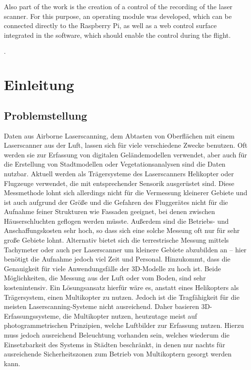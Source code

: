 \documentclass[a4paper,12pt,bibliography=totoc, listof=totoc,titlepage,pointlessnumbers]{scrreprt}
\begin{document}
Also part of the work is the creation of a control of the recording of the laser scanner. For this purpose, an operating module was developed, which can be connected directly to the Raspberry Pi, as well as a web control surface integrated in the software, which should enable the control during the flight.


\providecommand{\citeTwo}[4]{\citep[{\citealp[#1]{#2};}][#3]{#4}} 
\providecommand{\citeThree}[6]{\citep[{\citealp[#1]{#2}; \citealp[#3]{#4};}][#5]{#6}} 
\providecommand{\citeFour}[8]{\citep[{\citealp[#1]{#2}; \citealp[#3]{#4}; \citealp[#5]{#6};}][#7]{#8}}.

\newpage

\tableofcontents
\newpage

\setcounter{page}{1} 

\chapter{Einleitung}

\section{Problemstellung}
Daten aus Airborne Laserscanning, dem Abtasten von Oberflächen mit einem Laser\-scan\-ner aus der Luft, lassen sich für viele verschiedene Zwecke benutzen. Oft werden sie zur Erfassung von digitalen Geländemodellen verwendet, aber auch für die Erstellung von Stadtmodellen oder Vegetationsanalysen sind die Daten nutzbar. Aktuell werden als Trägersysteme des Laser\-scan\-ners Helikopter oder Flugzeuge verwendet, die mit entsprechender Sensorik ausgerüstet sind. Diese Messmethode lohnt sich allerdings nicht für die Vermessung kleinerer Gebiete und ist auch aufgrund der Größe und die Gefahren des Fluggerätes nicht für die Aufnahme feiner Strukturen wie Fassaden geeignet, bei denen zwischen Häuserschluchten geflogen werden müsste. Außerdem sind die Betriebs- und Anschaffungskosten sehr hoch, so dass sich eine solche Messung oft nur für sehr große Gebiete lohnt. Alternativ bietet sich die terrestrische Messung mittels Tachymeter oder auch per Laser\-scan\-ner um kleinere Gebiete abzubilden an -- hier benötigt die Aufnahme jedoch viel Zeit und Personal. Hinzukommt, dass die Genauigkeit für viele Anwendungsfälle der 3D-Modelle zu hoch ist. Beide Möglichkeiten, die Messung aus der Luft oder vom Boden, sind sehr kostenintensiv. Ein Lösungsansatz hierfür wäre es, anstatt eines Helikopters als Trägersystem, einen Multikopter zu nutzen. Jedoch ist die Tragfähigkeit für die meisten Laserscanning-Systeme nicht ausreichend. Daher basieren 3D-Erfassungssysteme, die Multikopter nutzen, heutzutage meist auf photogrammetrischen Prinzipien, welche Luftbilder zur Erfassung nutzen. Hierzu muss jedoch ausreichend Beleuchtung vorhanden sein, welches wiederum die Einsetzbarkeit des Systems in Städten beschränkt, in denen nur nachts für ausreichende Sicherheitszonen zum Betrieb von Multikoptern gesorgt werden kann. \citep{carlos}
\end{document}
